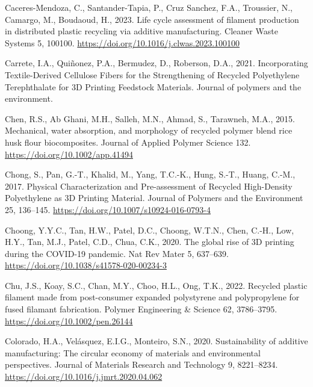 \documentclass[
  12pt,
  number,
  review]{elsarticle}
\newlength{\cslhangindent}
\newlength{\cslentryspacingunit} %
\newenvironment{CSLReferences}[2] %
 {%
  \setlength{\parindent}{0pt}
  \ifodd #1
  \let\oldpar\par
  \def\par{\hangindent=\cslhangindent\oldpar}
  \fi
  \setlength{\parskip}{#2\cslentryspacingunit}
 }%
 {}
\begin{document}
\begin{CSLReferences}{1}{0}
\leavevmode{}%
Caceres-Mendoza, C., Santander-Tapia, P., Cruz Sanchez, F.A., Troussier,
N., Camargo, M., Boudaoud, H., 2023. Life cycle assessment of filament
production in distributed plastic recycling via additive manufacturing.
Cleaner Waste Systems 5, 100100.
\url{https://doi.org/10.1016/j.clwas.2023.100100}

\leavevmode{}%
Carrete, I.A., Quiñonez, P.A., Bermudez, D., Roberson, D.A., 2021.
Incorporating {Textile-Derived Cellulose Fibers} for the {Strengthening}
of {Recycled Polyethylene Terephthalate} for {3D Printing Feedstock
Materials}. Journal of polymers and the environment.

\leavevmode{}%
Chen, R.S., Ab Ghani, M.H., Salleh, M.N., Ahmad, S., Tarawneh, M.A.,
2015. Mechanical, water absorption, and morphology of recycled polymer
blend rice husk flour biocomposites. Journal of Applied Polymer Science
132. \url{https://doi.org/10.1002/app.41494}

\leavevmode{}%
Chong, S., Pan, G.-T., Khalid, M., Yang, T.C.-K., Hung, S.-T., Huang,
C.-M., 2017. Physical {Characterization} and {Pre-assessment} of
{Recycled High-Density Polyethylene} as {3D Printing Material}. Journal
of Polymers and the Environment 25, 136--145.
\url{https://doi.org/10.1007/s10924-016-0793-4}

\leavevmode{}%
Choong, Y.Y.C., Tan, H.W., Patel, D.C., Choong, W.T.N., Chen, C.-H.,
Low, H.Y., Tan, M.J., Patel, C.D., Chua, C.K., 2020. The global rise of
3D printing during the {COVID}-19 pandemic. Nat Rev Mater 5, 637--639.
\url{https://doi.org/10.1038/s41578-020-00234-3}

\leavevmode{}%
Chu, J.S., Koay, S.C., Chan, M.Y., Choo, H.L., Ong, T.K., 2022. Recycled
plastic filament made from post-consumer expanded polystyrene and
polypropylene for fused filamant fabrication. Polymer Engineering \&
Science 62, 3786--3795. \url{https://doi.org/10.1002/pen.26144}

\leavevmode{}%
Colorado, H.A., Velásquez, E.I.G., Monteiro, S.N., 2020. Sustainability
of additive manufacturing: The circular economy of materials and
environmental perspectives. Journal of Materials Research and Technology
9, 8221--8234. \url{https://doi.org/10.1016/j.jmrt.2020.04.062}


\end{CSLReferences}
\end{document}

